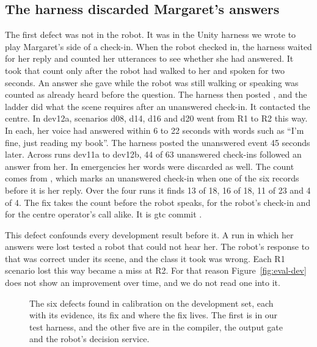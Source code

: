 \subsection{The harness discarded Margaret's answers}

The first defect was not in the robot.
It was in the Unity harness we wrote to play Margaret's side of a check-in.
When the robot checked in, the harness waited for her reply and counted her utterances to see
whether she had answered.
It took that count only after the robot had walked to her and spoken for two seconds.
An answer she gave while the robot was still walking or speaking was counted as already heard
before the question.
The harness then posted , and the ladder did what the scene requires
after an unanswered check-in.
It contacted the centre.
In dev12a, scenarios d08, d14, d16 and d20 went from R1 to R2 this way.
In each, her voice had answered within 6 to 22 seconds with words such as ``I'm fine, just reading
my book''.
The harness posted the unanswered event 45 seconds later.
Across runs dev11a to dev12b, 44 of 63 unanswered check-ins followed an answer from her.
In emergencies her words were discarded as well.
The count comes from , which marks an unanswered check-in when one of
the six records before it is her reply. Over the four runs it finds 13 of 18, 16 of 18, 11 of 23
and 4 of 4.
The fix takes the count before the robot speaks, for the robot's check-in and for the centre
operator's call alike.
It is gtc commit .

This defect confounds every development result before it.
A run in which her answers were lost tested a robot that could not hear her.
The robot's response to that was correct under its scene, and the class it took was wrong.
Each R1 scenario lost this way became a miss at R2.
For that reason Figure~\ref{fig:eval-dev} does not show an improvement over time, and we do not
read one into it.

\begin{figure}[t]
\centering

\caption{The six defects found in calibration on the development set, each with its evidence, its fix and where the fix lives. The first is in our test harness, and the other five are in the compiler, the output gate and the robot's decision service.}
\label{fig:eval-calibration}
\end{figure}

